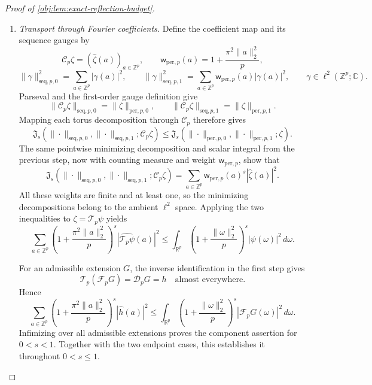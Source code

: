 \documentclass[11pt]{article}
\begin{document}
\begin{proof}[Proof of \cref{obj:lem:exact-reflection-budget}]
\begin{enumerate}
\item \textit{Transport through Fourier coefficients.}
Define the coefficient map and its sequence gauges by
\[
\mathscr C_p\zeta=(\widehat\zeta(a))_{a\in\mathbb Z^p},
\qquad
\mathsf w_{\mathrm{per},p}(a)
=
1+\frac{\pi^2\|a\|_2^2}{p},
\]
\[
\|\gamma\|_{\mathrm{seq},p,0}^2
=
\sum_{a\in\mathbb Z^p}|\gamma(a)|^2,
\qquad
\|\gamma\|_{\mathrm{seq},p,1}^2
=
\sum_{a\in\mathbb Z^p}
\mathsf w_{\mathrm{per},p}(a)|\gamma(a)|^2,
\qquad \gamma\in\ell^2(\mathbb Z^p;\mathbb C).
\]
Parseval and the first-order gauge definition give
\[
\|\mathscr C_p\zeta\|_{\mathrm{seq},p,0}
=
\|\zeta\|_{\mathrm{per},p,0},
\qquad
\|\mathscr C_p\zeta\|_{\mathrm{seq},p,1}
=
\|\zeta\|_{\mathrm{per},p,1}.
\]
Mapping each torus decomposition through \(\mathscr C_p\) therefore gives
\[
\mathfrak J_s\!\left(
\|\cdot\|_{\mathrm{seq},p,0},
\|\cdot\|_{\mathrm{seq},p,1};
\mathscr C_p\zeta
\right)
\leq
\mathfrak J_s\!\left(
\|\cdot\|_{\mathrm{per},p,0},
\|\cdot\|_{\mathrm{per},p,1};
\zeta
\right).
\]
The same pointwise minimizing decomposition and scalar integral from the previous step, now with counting measure and weight
\(\mathsf w_{\mathrm{per},p}\), show that
\[
\mathfrak J_s\!\left(
\|\cdot\|_{\mathrm{seq},p,0},
\|\cdot\|_{\mathrm{seq},p,1};
\mathscr C_p\zeta
\right)
=
\sum_{a\in\mathbb Z^p}
\mathsf w_{\mathrm{per},p}(a)^s|\widehat\zeta(a)|^2.
\]
All these weights are finite and at least one, so the minimizing decompositions belong to the ambient \(\ell^2\) space. Applying the two inequalities to \(\zeta=\mathscr T_p\psi\) yields
\[
\sum_{a\in\mathbb Z^p}
\left(1+\frac{\pi^2\|a\|_2^2}{p}\right)^s
|\widehat{\mathscr T_p\psi}(a)|^2
\leq
\int_{\mathbb R^p}
\left(1+\frac{\|\omega\|_2^2}{p}\right)^s
|\psi(\omega)|^2\,d\omega.
\]

For an admissible extension \(G\), the inverse identification in the first step gives
\[
\mathscr T_p(\mathcal F_pG)=\mathscr D_pG=h
\quad\text{almost everywhere}.
\]
Hence
\[
\sum_{a\in\mathbb Z^p}
\left(1+\frac{\pi^2\|a\|_2^2}{p}\right)^s
|\widehat h(a)|^2
\leq
\int_{\mathbb R^p}
\left(1+\frac{\|\omega\|_2^2}{p}\right)^s
|\mathcal F_pG(\omega)|^2\,d\omega.
\]
Infimizing over all admissible extensions proves the component assertion for \(0<s<1\). Together with the two endpoint cases, this establishes it throughout \(0<s\leq1\).


\end{enumerate}
\end{proof}
\end{document}
